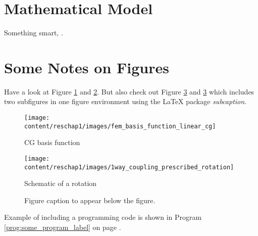 \section{Mathematical Model}
Something smart, \cite{Gorman2006phd}.

\section{Some Notes on Figures}
Have a look at Figure \ref{fig:basis_fun_cg} and \ref{fig:rotation_schematic}. But also check out Figure \ref{fig:basis_functions} and \ref{fig:basis_functions} which includes two subfigures in one figure environment using the \LaTeX{} package \textsl{subcaption}.

\begin{figure}[p]
 \centering
 \texttt{[image: content/reschap1/images/fem\_basis\_function\_linear\_cg]}
 \caption[Basis function]{CG basis function}
 \label{fig:basis_fun_cg}
\end{figure}

\begin{figure}[p]
 \centering
 \texttt{[image: content/reschap1/images/1way\_coupling\_prescribed\_rotation]}
 \caption[Schematic]{Schematic of a rotation}
 \label{fig:rotation_schematic}
\end{figure}

\begin{figure}[p!]
 \centering
 \captionsetup[sub]{skip=0ex}
 \hfill
%
 \caption[Figure caption to appear in \textsl{List of Figures}]{Figure caption to appear below the figure.}
 \label{fig:basis_functions}
\end{figure}

Example of including a programming code is shown in Program \ref{prog:some_program_label} on page \pageref{prog:some_program_label}.

\clearpage
\begin{program}[p]

\end{program}
